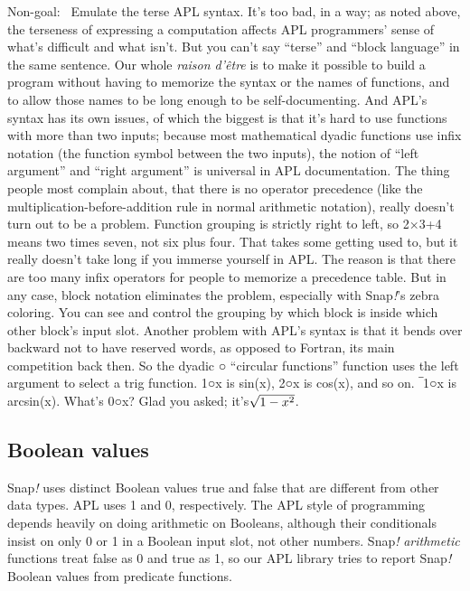 \documentclass[
  letterpaper,
]{book}
\begin{document}
Non-goal:~ Emulate the terse APL syntax. It's too bad, in a way; as
noted above, the terseness of expressing a computation affects APL
programmers' sense of what's difficult and what isn't. But you can't say
``terse'' and ``block language'' in the same sentence. Our whole
\emph{raison d'être} is to make it possible to build a program without
having to memorize the syntax or the names of functions, and to allow
those names to be long enough to be self-documenting. And APL's syntax
has its own issues, of which the biggest is that it's hard to use
functions with more than two inputs; because most mathematical dyadic
functions use infix notation (the function symbol between the two
inputs), the notion of ``left argument'' and ``right argument'' is
universal in APL documentation. The thing people most complain about,
that there is no operator precedence (like the
multiplication-before-addition rule in normal arithmetic notation),
really doesn't turn out to be a problem. Function grouping is strictly
right to left, so 2×3+4 means two times seven, not six plus four. That
takes some getting used to, but it really doesn't take long if you
immerse yourself in APL. The reason is that there are too many infix
operators for people to memorize a precedence table. But in any case,
block notation eliminates the problem, especially with Snap\emph{!}'s
zebra coloring. You can see and control the grouping by which block is
inside which other block's input slot. Another problem with APL's syntax
is that it bends over backward not to have reserved words, as opposed to
Fortran, its main competition back then. So the dyadic \textbf{○}
``circular functions'' function uses the left argument to select a trig
function. 1\textbf{○}x is sin(x), 2\textbf{○}x is cos(x), and so on.
\textbf{‾}1\textbf{○}x is arcsin(x). What's 0\textbf{○}x? Glad you
asked; it's\(\\\sqrt{1 - x^{2}}\).

\subsection{Boolean values}\label{boolean-values}

Snap\emph{!} uses distinct Boolean values true and false that are
different from other data types. APL uses 1 and 0, respectively. The APL
style of programming depends heavily on doing arithmetic on Booleans,
although their conditionals insist on only 0 or 1 in a Boolean input
slot, not other numbers. Snap\emph{!} \emph{arithmetic} functions treat
false as 0 and true as 1, so our APL library tries to report
Snap\emph{!} Boolean values from predicate functions.
\end{document}
